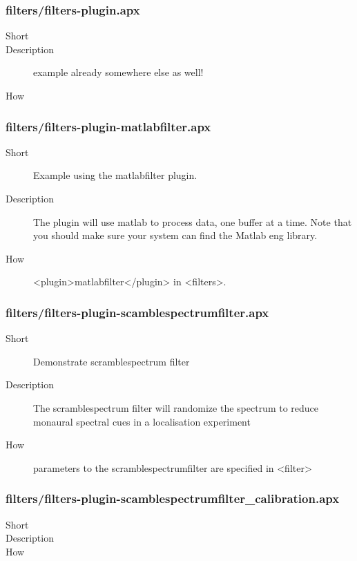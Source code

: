 \subsubsection{filters/filters-plugin.apx}
\begin{description}
\item[Short] 

\item[Description] 
 example already somewhere else as well!
\item[How] 

\end{description}

\subsubsection{filters/filters-plugin-matlabfilter.apx}
\begin{description}
\item[Short] 
 Example using the matlabfilter plugin.
\item[Description] 
  The plugin will use matlab to process data, one buffer at a time. Note that you should make sure your system can find the Matlab eng library.
\item[How] 
 \textless{}plugin\textgreater{}matlabfilter\textless{}/plugin\textgreater{} in \textless{}filters\textgreater{}.
\end{description}

\subsubsection{filters/filters-plugin-scamblespectrumfilter.apx}
\begin{description}
\item[Short] 
 Demonstrate scramblespectrum filter
\item[Description] 
 The scramblespectrum filter will randomize the spectrum to reduce monaural spectral cues in a localisation experiment
\item[How] 
 parameters to the scramblespectrumfilter are specified in \textless{}filter\textgreater{}
\end{description}

\subsubsection{filters/filters-plugin-scamblespectrumfilter\_calibration.apx}
\begin{description}
\item[Short] 

\item[Description] 

\item[How] 

\end{description}

